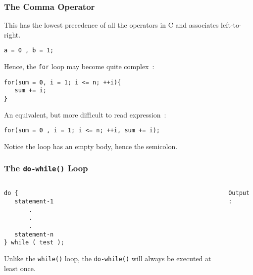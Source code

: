 \begin{frame}[fragile]
\frametitle{The Comma Operator}

This has the lowest precedence of all the operators in C
and associates left-to-right.

\begin{lstlisting}[style=basicc,numbers=none]
a = 0 , b = 1;
\end{lstlisting}

Hence, the {\tt for} loop may become quite complex~:

\begin{lstlisting}[style=basicc,numbers=none]
for(sum = 0, i = 1; i <= n; ++i){
   sum += i;
}
\end{lstlisting}

An equivalent, but more difficult to read expression~:
\begin{lstlisting}[style=basicc,numbers=none]
for(sum = 0 , i = 1; i <= n; ++i, sum += i);
\end{lstlisting}

Notice the loop has an empty body, hence the semicolon.
\end{frame}

\begin{frame}[fragile]
\frametitle{The {\tt do-while()} Loop}

\begin{columns}
\begin{column}{0.35\textwidth}
\begin{lstlisting}[style=basicc,numbers=none]
do {
   statement-1
       .
       .
       .
   statement-n
} while ( test );
\end{lstlisting}

Unlike the \verb^while()^ loop, the \verb^do-while()^ will always
be executed at least once.
\end{column}

\begin{column}{0.60\textwidth}

{\scriptsize{\tt Output :}}
\end{column}

\end{columns}
\end{frame}

